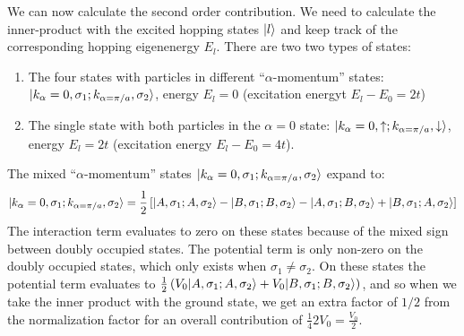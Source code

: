 \documentclass[12pt]{article}
\DeclarePairedDelimiter\ket{\lvert}{\rangle}%
\numberwithin{equation}{section}
\begin{document}
We can now calculate the second order contribution. We need to calculate the inner-product with the excited hopping states $\ket{l}$ and keep track of the corresponding hopping eigenenergy $E_l$. There are two two types of states:
\begin{enumerate}
    \item The four states with particles in different ``$\alpha$-momentum'' states:  $\ket{k_\alpha=0,\sigma_1;k_{\alpha=\pi/a},\sigma_2}$, energy $E_l=0$ (excitation energyt $E_l-E_0=2t$)
    \item The single state with both particles in the $\alpha=0$ state: $\ket{k_\alpha=0,\uparrow;k_{\alpha=\pi/a},\downarrow}$, energy $E_l=2t$ (excitation energy $E_l-E_0=4t$).
\end{enumerate}
The mixed ``$\alpha$-momentum'' states $\ket{k_\alpha=0,\sigma_1;k_{\alpha=\pi/a},\sigma_2}$ expand to:
\begin{align}
    \ket{k_\alpha=0,\sigma_1;k_{\alpha=\pi/a},\sigma_2}
    =\frac{1}{2}\left[\ket{A,\sigma_1;A,\sigma_2}-\ket{B,\sigma_1;B,\sigma_2}
    -\ket{A,\sigma_1;B,\sigma_2}+\ket{B,\sigma_1;A,\sigma_2}\right]
\end{align}
The interaction term evaluates to zero on these states because of the mixed sign between doubly occupied states. The potential term is only non-zero on the doubly occupied states, which only exists when $\sigma_1\neq\sigma_2$. On these states the potential term evaluates to 
$\frac{1}{2}\left(V_0\ket{A,\sigma_1;A,\sigma_2}+V_0\ket{B,\sigma_1;B,\sigma_2}\right)$, and so when we take the inner product with the ground state, we get an extra factor of $1/2$ from the normalization factor for an overall contribution of $\frac{1}{4} 2V_0=\frac{V_0}{2}$.
\end{document}

